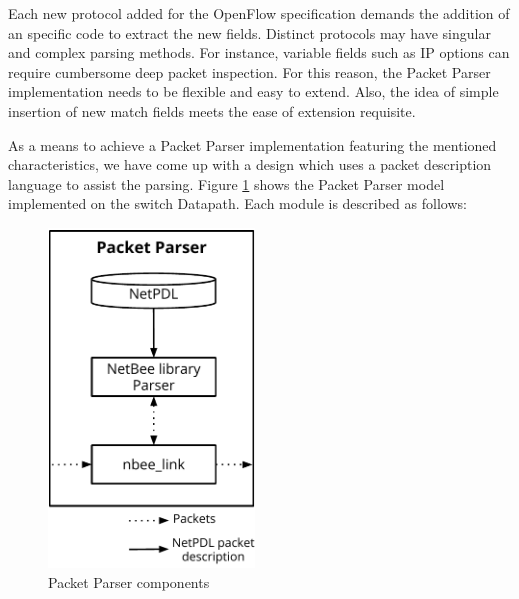     Each new protocol added for the OpenFlow specification demands the addition of an specific code to extract the new fields. Distinct protocols may have singular and complex parsing methods. For instance, variable fields such as IP options can require cumbersome deep packet inspection. For this reason, the Packet Parser implementation needs to be flexible and easy to extend. Also, the idea of simple insertion of new match fields meets the ease of extension requisite.    
    
    As a means to achieve a Packet Parser implementation featuring the mentioned characteristics, we have come up with a design which uses a packet description language to assist the parsing. Figure \ref{fig:netbee} shows the Packet Parser model implemented on the switch Datapath. Each module is described as follows:
    
    \begin{figure}[h]
    \centering
    \includegraphics[height=9cm,width=\textwidth,keepaspectratio]{eps/PacketParserEngine.pdf}
    \caption{Packet Parser components}
    \label{fig:netbee}
    \end{figure}
    
